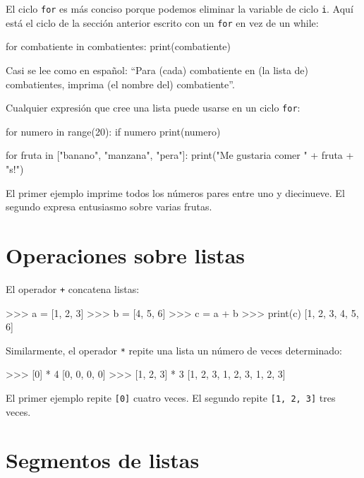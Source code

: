 El ciclo \texttt{for} es más conciso porque podemos eliminar la variable
de ciclo \texttt{i}. Aquí está el ciclo de la sección anterior escrito
con un \texttt{for} en vez de un while: 
\begin{pythoncode}
for combatiente in combatientes:
  print(combatiente)
\end{pythoncode}

Casi se lee como en español: ``Para (cada) combatiente en (la lista
de) combatientes, imprima (el nombre del) combatiente''.

Cualquier expresión que cree una lista puede usarse en un ciclo \texttt{for}:
\begin{pythoncode}
for numero in range(20):
  if numero %
    print(numero)

for fruta in ["banano", "manzana", "pera"]:
  print("Me gustaria comer " + fruta + "s!")
\end{pythoncode}

El primer ejemplo imprime todos los números pares entre uno y diecinueve.
El segundo expresa entusiasmo sobre varias frutas.

\section{Operaciones sobre listas}

 

El operador \texttt{+} concatena listas:

\begin{pyconcode}
>>> a = [1, 2, 3]
>>> b = [4, 5, 6]
>>> c = a + b
>>> print(c)
[1, 2, 3, 4, 5, 6]
\end{pyconcode}

Similarmente, el operador \texttt{{*}} repite una lista un número
de veces determinado:

\begin{pyconcode}
>>> [0] * 4
[0, 0, 0, 0]
>>> [1, 2, 3] * 3
[1, 2, 3, 1, 2, 3, 1, 2, 3]
\end{pyconcode}

El primer ejemplo repite \texttt{{[}0{]}} cuatro veces. El segundo
repite \texttt{{[}1, 2, 3{]}} tres veces.

\section{Segmentos de listas}

